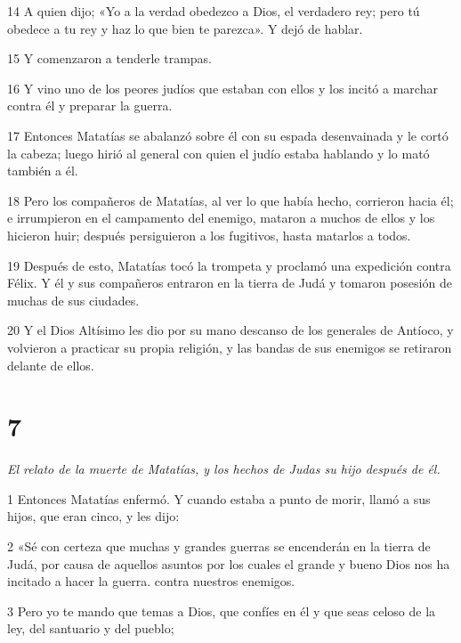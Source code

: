 \par 14 A quien dijo; «Yo a la verdad obedezco a Dios, el verdadero rey; pero tú obedece a tu rey y haz lo que bien te parezca». Y dejó de hablar.

\par 15 Y comenzaron a tenderle trampas.

\par 16 Y vino uno de los peores judíos que estaban con ellos y los incitó a marchar contra él y preparar la guerra.

\par 17 Entonces Matatías se abalanzó sobre él con su espada desenvainada y le cortó la cabeza; luego hirió al general con quien el judío estaba hablando y lo mató también a él.

\par 18 Pero los compañeros de Matatías, al ver lo que había hecho, corrieron hacia él; e irrumpieron en el campamento del enemigo, mataron a muchos de ellos y los hicieron huir; después persiguieron a los fugitivos, hasta matarlos a todos.

\par 19 Después de esto, Matatías tocó la trompeta y proclamó una expedición contra Félix. Y él y sus compañeros entraron en la tierra de Judá y tomaron posesión de muchas de sus ciudades.

\par 20 Y el Dios Altísimo les dio por su mano descanso de los generales de Antíoco, y volvieron a practicar su propia religión, y las bandas de sus enemigos se retiraron delante de ellos.

\chapter{7}

\par \textit{El relato de la muerte de Matatías, y los hechos de Judas su hijo después de él.}

\par 1 Entonces Matatías enfermó. Y cuando estaba a punto de morir, llamó a sus hijos, que eran cinco, y les dijo:

\par 2 «Sé con certeza que muchas y grandes guerras se encenderán en la tierra de Judá, por causa de aquellos asuntos por los cuales el grande y bueno Dios nos ha incitado a hacer la guerra. contra nuestros enemigos.

\par 3 Pero yo te mando que temas a Dios, que confíes en él y que seas celoso de la ley, del santuario y del pueblo;


